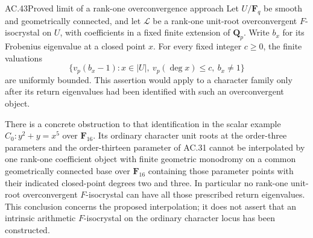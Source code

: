 \begin{claim}{AC.43}{Proved limit of a rank-one overconvergence approach}
Let $U/\mathbf F_q$ be smooth and geometrically connected, and let
$\mathcal L$ be a rank-one unit-root overconvergent $F$-isocrystal
on $U$, with coefficients in a fixed finite extension of
$\mathbf Q_p$. Write $b_x$ for its Frobenius eigenvalue at a closed
point $x$. For every fixed integer $c\ge0$, the finite valuations
\[
 \{v_p(b_x-1):x\in|U|,\ v_p(\deg x)\le c,\ b_x\ne1\}
                                                        \tag{AC.43.1}
\]
are uniformly bounded. This assertion would apply to a character
family only after its return eigenvalues had been identified with
such an overconvergent object.

There is a concrete obstruction to that identification in the
scalar example $C_0:y^2+y=x^5$ over $\mathbf F_{16}$. Its ordinary
character unit roots at the order-three parameters and the order-thirteen
parameter of AC.31 cannot be interpolated by one rank-one coefficient
object with finite geometric monodromy on a common geometrically
connected base over $\mathbf F_{16}$ containing those parameter
points with their indicated closed-point degrees two and three.
In particular no rank-one
unit-root overconvergent $F$-isocrystal can have all those prescribed
return eigenvalues. This conclusion concerns the proposed interpolation;
it does not assert that an intrinsic arithmetic $F$-isocrystal on
the ordinary character locus has been constructed.
\end{claim}
